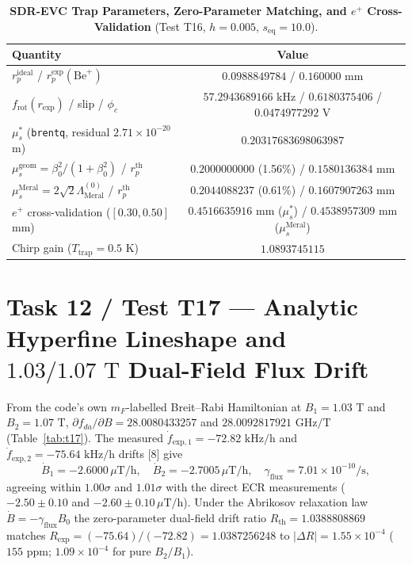 \documentclass[12pt,a4paper]{article}
\begin{document}
\begin{table}[!htbp]
\centering
\footnotesize
\setlength{\tabcolsep}{3pt}
\caption{\textbf{SDR-EVC Trap Parameters, Zero-Parameter Matching, and $e^+$ Cross-Validation} (Test T16, $h=0.005$, $s_{\mathrm{eq}}=10.0$).}
\label{tab:t16}
\vspace{0.1cm}
\begin{tabular}{@{}l|c@{}}
\hline
Quantity & Value \\
\hline
$r_p^{\mathrm{ideal}}$ / $r_p^{\mathrm{exp}}(\mathrm{Be}^+)$ & $0.0988849784$ / $0.160000$ mm \\
$f_{\mathrm{rot}}(r_{\mathrm{exp}})$ / slip / $\phi_c$ & $57.2943689166$ kHz / $0.6180375406$ / $0.0474977292$ V \\
$\mu_s^*$ (\texttt{brentq}, residual $2.71\times10^{-20}$ m) & $0.20317683698063987$ \\
$\mu_s^{\mathrm{geom}} = \beta_0^2/(1+\beta_0^2)$ / $r_p^{\mathrm{th}}$ & $0.2000000000$ (1.56\%) / $0.1580136384$ mm \\
$\mu_s^{\mathrm{Meral}} = 2\sqrt{2}\Lambda_{\mathrm{Meral}}^{(0)}$ / $r_p^{\mathrm{th}}$ & $0.2044088237$ (0.61\%) / $0.1607907263$ mm \\
$e^+$ cross-validation ($[0.30, 0.50]$ mm) & $0.4516635916$ mm ($\mu_s^*$) / $0.4538957309$ mm ($\mu_s^{\mathrm{Meral}}$) \\
Chirp gain ($T_{\mathrm{trap}}=0.5$ K) & $1.0893745115$ \\
\hline
\end{tabular}
\end{table}

\section{Task 12 / Test T17 --- Analytic Hyperfine Lineshape and $1.03/1.07\text{ T}$ Dual-Field Flux Drift}

From the code's own $m_F$-labelled Breit--Rabi Hamiltonian at $B_1=1.03\text{ T}$ and $B_2=1.07\text{ T}$, $\partial f_{da}/\partial B = 28.0080433257$ and $28.0092817921\text{ GHz/T}$ (Table~\ref{tab:t17}). The measured $\dot{f}_{\mathrm{exp},1}=-72.82\text{ kHz/h}$ and $\dot{f}_{\mathrm{exp},2}=-75.64\text{ kHz/h}$ drifts [8] give
\begin{equation}
\dot{B}_1 = -2.6000\,\mu\text{T/h}, \quad \dot{B}_2 = -2.7005\,\mu\text{T/h}, \quad \gamma_{\mathrm{flux}} = 7.01\times 10^{-10}\text{/s},
\label{eq:fluxdrift}
\end{equation}
agreeing within $1.00\sigma$ and $1.01\sigma$ with the direct ECR measurements ($-2.50\pm0.10$ and $-2.60\pm0.10\,\mu\text{T/h}$). Under the Abrikosov relaxation law $\dot{B}=-\gamma_{\mathrm{flux}}B_0$ the zero-parameter dual-field drift ratio $R_{\mathrm{th}} = 1.0388808869$ matches $R_{\mathrm{exp}} = (-75.64)/(-72.82) = 1.0387256248$ to $\vert{}\Delta R\vert{} = 1.55\times 10^{-4}$ ($155\text{ ppm}$; $1.09\times 10^{-4}$ for pure $B_2/B_1$).
\end{document}
